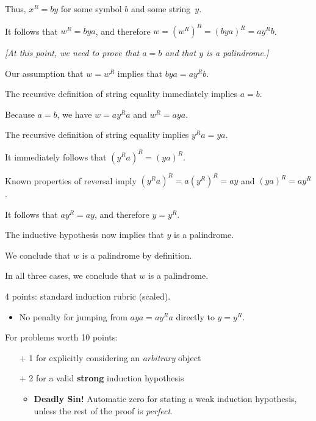\documentclass[11pt]{article}
\begin{document}
\begin{enumerate}
\begin{solution}
\begin{enumerate}
\begin{itemize}
Thus, $x^R = by$ for some symbol $b$ and some string~$y$.

It follows that $w^R = bya$, and therefore $w = (w^R)^R = (bya)^R = a y^R b$.


\medskip
\emph{[At this point, we need to prove that $a=b$ and that $y$ is a palindrome.]}
\medskip

Our assumption that $w = w^R$ implies that $bya = a y^R b$.

The recursive definition of string equality immediately implies $a=b$.

\medskip
Because $a=b$, we have $w = ay^Ra$ and $w^R = a y a$.

The recursive definition of string equality implies $y^Ra = ya$.

It immediately follows that $(y^R a)^R = (ya)^R$.

Known properties of reversal imply $(y^R a)^R = a (y^R)^R = ay$ and $(ya)^R = a y^R$.

It follows that $ay^R = ay$, and therefore $y = y^R$.

The inductive hypothesis now implies that $y$ is a palindrome.

\medskip
We conclude that $w$ is a palindrome by definition.
\end{itemize}
In all three cases, we conclude that $w$ is a palindrome.
\end{enumerate}

\begin{rubric}
4 points: standard induction rubric (scaled).
\begin{itemize}
\item No penalty for jumping from $aya = ay^Ra$ directly to $y = y^R$.
\end{itemize}
\end{rubric}

\end{solution}



\begin{rubric}[induction]
For problems worth 10 points:
\begin{itemize}\itemsep0pt
\item[+] 1 for explicitly considering an \emph{arbitrary} object

\item[+] 2 for a valid \textbf{strong} induction hypothesis
\begin{itemize}\itemsep0pt
\item \textbf{\color{Red}Deadly Sin!} Automatic zero for stating a weak induction hypothesis, unless the rest of the proof is \emph{perfect}.
\end{itemize}


\end{itemize}
\end{rubric}
\end{enumerate}
\end{document}
